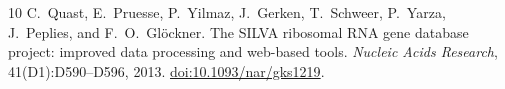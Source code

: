 \begin{thebibliography}{10}
C.~Quast, E.~Pruesse, P.~Yilmaz, J.~Gerken, T.~Schweer, P.~Yarza, J.~Peplies, and F.~O.~Gl\"ockner.
\newblock The {SILVA} ribosomal {RNA} gene database project: improved data processing and web-based tools.
\newblock \emph{Nucleic Acids Research}, 41(D1):D590--D596, 2013.
\newblock \href{https://doi.org/10.1093/nar/gks1219}{doi:10.1093/nar/gks1219}.

\end{thebibliography}
